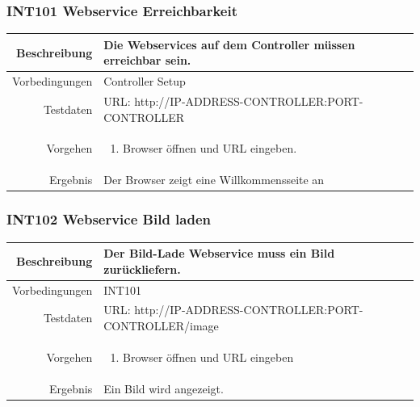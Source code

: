 \subsubsection{INT101 Webservice Erreichbarkeit}
\begin{table}[h!]
	\renewcommand{\arraystretch}{1.5}
	\begin{tabular}{|r|p{14cm}|}
		\hline Beschreibung & Die Webservices auf dem Controller müssen erreichbar sein. \\ 
		\hline Vorbedingungen & Controller Setup \\ 
		\hline Testdaten & URL: http://IP-ADDRESS-CONTROLLER:PORT-CONTROLLER \\ 
		\hline Vorgehen & 
		\begin{enumerate}
			\item Browser öffnen und URL eingeben.
		\end{enumerate} \\ 
		\hline Ergebnis & Der Browser zeigt eine Willkommensseite an \\ 
		\hline 
	\end{tabular}
\end{table}

\subsubsection{INT102 Webservice Bild laden}
\begin{table}[h!]
	\renewcommand{\arraystretch}{1.5}
	\begin{tabular}{|r|p{14cm}|}
		\hline Beschreibung & Der Bild-Lade Webservice muss ein Bild zurückliefern. \\ 
		\hline Vorbedingungen & INT101 \\ 
		\hline Testdaten & URL: http://IP-ADDRESS-CONTROLLER:PORT-CONTROLLER/image \\ 
		\hline Vorgehen & 
		\begin{enumerate}
			\item Browser öffnen und URL eingeben
		\end{enumerate} \\ 
		\hline Ergebnis & Ein Bild wird angezeigt. \\ 
		\hline 
	\end{tabular}
\end{table}

